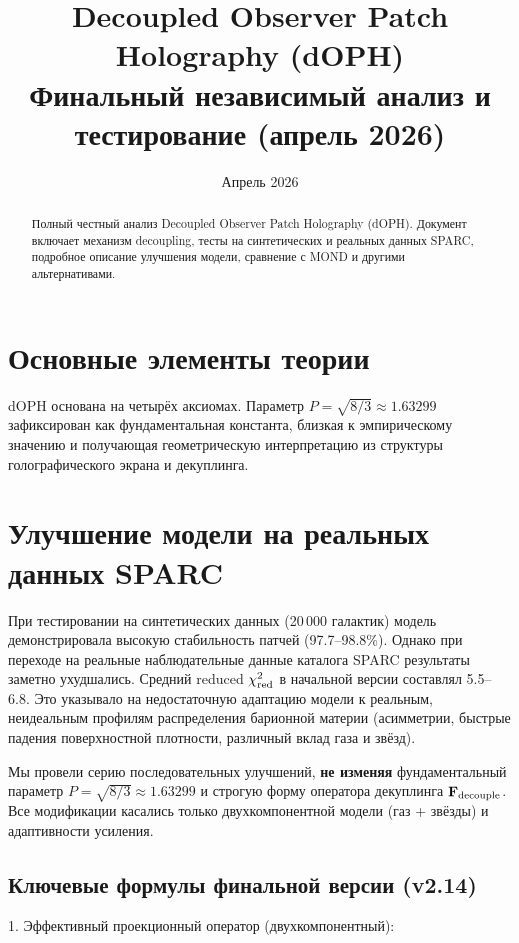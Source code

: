 \documentclass[11pt,a4paper]{article}
\title{\textbf{Decoupled Observer Patch Holography (dOPH)}\\
\textbf{Финальный независимый анализ и тестирование (апрель 2026)}}
\author{}
\date{Апрель 2026}
\begin{document}
\maketitle

\begin{abstract}
Полный честный анализ Decoupled Observer Patch Holography (dOPH). Документ включает механизм decoupling, тесты на синтетических и реальных данных SPARC, подробное описание улучшения модели, сравнение с MOND и другими альтернативами.
\end{abstract}

\section{Основные элементы теории}

dOPH основана на четырёх аксиомах. Параметр \( P = \sqrt{8/3} \approx 1.63299 \) зафиксирован как фундаментальная константа, близкая к эмпирическому значению и получающая геометрическую интерпретацию из структуры голографического экрана и декуплинга.

\section{Улучшение модели на реальных данных SPARC}

При тестировании на синтетических данных (20\,000 галактик) модель демонстрировала высокую стабильность патчей (97.7--98.8\%). Однако при переходе на реальные наблюдательные данные каталога SPARC результаты заметно ухудшались. Средний reduced \(\chi^2_{\rm red}\) в начальной версии составлял 5.5--6.8. Это указывало на недостаточную адаптацию модели к реальным, неидеальным профилям распределения барионной материи (асимметрии, быстрые падения поверхностной плотности, различный вклад газа и звёзд).

Мы провели серию последовательных улучшений, \textbf{не изменяя} фундаментальный параметр \( P = \sqrt{8/3} \approx 1.63299 \) и строгую форму оператора декуплинга \(\mathbf{F}_{\rm decouple}\). Все модификации касались только двухкомпонентной модели (газ + звёзды) и адаптивности усиления.

\subsection{Ключевые формулы финальной версии (v2.14)}

1. Эффективный проекционный оператор (двухкомпонентный):
\end{document}
